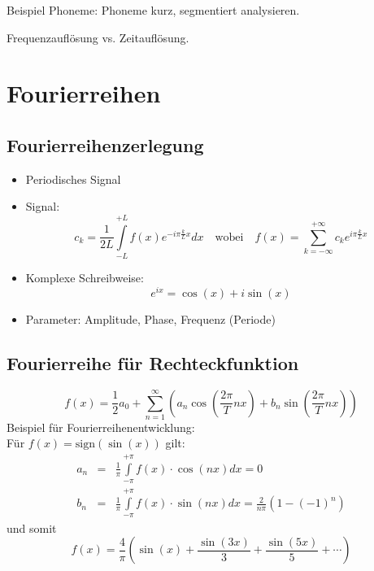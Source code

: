 Beispiel Phoneme: Phoneme kurz, segmentiert analysieren.

Frequenzauflösung vs. Zeitauflösung.

\section{Fourierreihen}

\subsection{Fourierreihenzerlegung}
\begin{itemize}
\item Periodisches Signal
\item Signal: $$c_k = \frac{1}{2L} \int\limits_{-L}^{+L} f(x) e^{-i \pi \frac{k}{L} x} dx \quad \textrm{wobei} \quad f(x) = \sum\limits_{k=- \infty}^{+ \infty} c_k e^{i \pi \frac{k}{L} x}$$
\item Komplexe Schreibweise: $$e^{ix} = \cos(x) + i \sin(x)$$
\item Parameter: Amplitude, Phase, Frequenz (Periode)
\end{itemize}

\subsection{Fourierreihe für Rechteckfunktion}
$$f(x) = \frac{1}{2} a_0 + \sum\limits_{n=1}^{\infty} \left( a_n \cos( \frac{2 \pi}{T} nx) + b_n \sin (\frac{2 \pi}{T} nx) \right)$$
Beispiel für Fourierreihenentwicklung: \\
Für $f(x) = \textrm{sign}(\sin(x))$ gilt:
\begin{eqnarray*}
a_n &=& \frac{1}{\pi} \int\limits_{- \pi}^{+ \pi} f(x) \cdot \cos(nx) dx = 0 \\
b_n &=& \frac{1}{\pi} \int\limits_{- \pi}^{+ \pi} f(x) \cdot \sin(nx) dx = \frac{2}{n \pi} (1 - (-1)^n)
\end{eqnarray*}
und somit $$f(x) = \frac{4}{\pi} \left( \sin(x) + \frac{\sin(3x)}{3} + \frac{\sin(5x)}{5} + \cdots \right)$$

